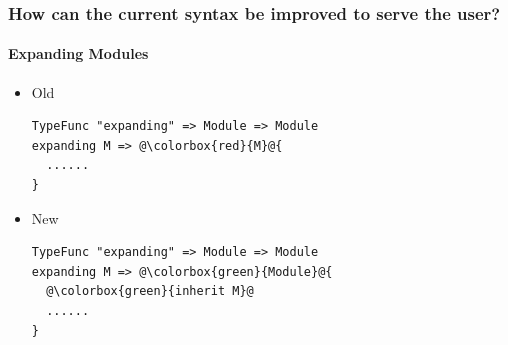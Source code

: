 \documentclass[xetex,serif]{beamer}
\begin{document}



\begin{frame}[fragile]
   \frametitle{How can the current syntax be improved to serve the user?}
   \framesubtitle{Expanding Modules}

   \begin{itemize}
      \item Old
         \begin{lstlisting}[escapechar=@]
TypeFunc "expanding" => Module => Module
expanding M => @\colorbox{red}{M}@{
  ......
}
         \end{lstlisting}

      \item New
         \begin{lstlisting}[escapechar=@]
TypeFunc "expanding" => Module => Module
expanding M => @\colorbox{green}{Module}@{
  @\colorbox{green}{inherit M}@
  ......
}
         \end{lstlisting}
   \end{itemize}
\end{frame}
\end{document}
